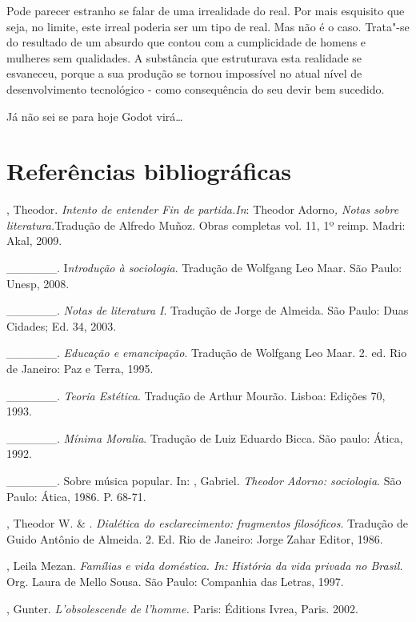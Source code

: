 {Pode parecer estranho se falar de uma irrealidade do real. Por mais
esquisito que seja, no limite, este irreal poderia ser um tipo de real.
Mas não é o caso. Trata"-se do resultado de um absurdo que contou com a
cumplicidade de homens e mulheres sem qualidades. A substância que
estruturava esta realidade se esvaneceu, porque a sua produção se tornou
impossível no atual nível de desenvolvimento tecnológico - como
consequência do seu devir bem sucedido.

Já não sei se para hoje Godot virá\ldots{}

\chapter{Referências bibliográficas}


\begin{Parskip}
, Theodor. \emph{Intento de entender Fin de partida.In}: Theodor
Adorno\emph{, Notas sobre literatura.}Tradução de Alfredo Muñoz. Obras
completas vol. 11, 1º reimp. Madri: Akal, 2009.

\_\_\_\_\_\_. I\emph{ntrodução à sociologia}. Tradução de Wolfgang Leo
Maar. São Paulo: Unesp, 2008.

\_\_\_\_\_\_. \emph{Notas de literatura I}. Tradução de Jorge de
Almeida. São Paulo: Duas Cidades; Ed. 34, 2003.

\_\_\_\_\_\_. \emph{Educação e emancipação}. Tradução de Wolfgang Leo
Maar. 2. ed. Rio de Janeiro: Paz e Terra, 1995.

\_\_\_\_\_\_. \emph{Teoria Estética}. Tradução de Arthur Mourão.
Lisboa: Edições 70, 1993.

\_\_\_\_\_\_. \emph{Mínima Moralia}. Tradução de Luiz Eduardo Bicca.
São paulo: Ática, 1992.

\_\_\_\_\_\_. Sobre música popular. In: , Gabriel. \emph{Theodor
Adorno: sociologia}. São Paulo: Ática, 1986. P. 68-71.

, Theodor W. \& . \emph{Dialética do esclarecimento:
fragmentos filosóficos}. Tradução de Guido Antônio de Almeida. 2. Ed.
Rio de Janeiro: Jorge Zahar Editor, 1986.

, Leila Mezan. \emph{Famílias e vida doméstica. In:}
\emph{História da vida privada no Brasil.} Org. Laura de Mello Sousa.
São Paulo: Companhia das Letras, 1997.

, Gunter. \emph{L'obsolescende de l'homme.} Paris: Éditions
Ivrea, Paris. 2002.


\end{Parskip}}
